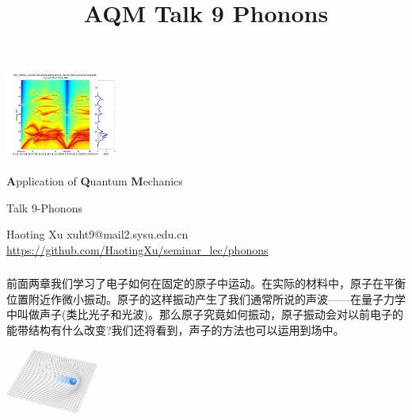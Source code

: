 \documentclass[CJK]{beamer}
\title{AQM Talk 9 Phonons}
\author{}
\date{}
\begin{document}
\begin{frame}
 
\begin{center}
\begin{Large}
  \bch
  \begin{center}
\includegraphics[width = 1.5in]{phonon_cover}
\end{center}

{\bf A}pplication of {\bf Q}uantum {\bf M}echanics

{\vskip 0.1in}

Talk 9-Phonons

\ech
\end{Large}
\end{center}


\vskip 0.1in
\begin{center}
Haoting Xu
\vskip 0.1in
xuht9@mail2.sysu.edu.cn
\vskip 0.1in
{\tiny \url{https://github.com/HaotingXu/seminar_lec/phonons} }\\
\end{center}


\end{frame}
\begin{frame}\frametitle{\ech}
  \bch
  前面两章我们学习了电子如何在固定的原子中运动。在实际的材料中，原子在平衡位置附近作微小振动。原子的这样振动产生了我们通常所说的声波——在量子力学中叫做声子(类比光子和光波)。那么原子究竟如何振动，原子振动会对以前电子的能带结构有什么改变?我们还将看到，声子的方法也可以运用到场中。
  \begin{center}
    \includegraphics[width = 1.2in]{phonon}
  \end{center}
  \ech
\end{frame}
\end{document}
